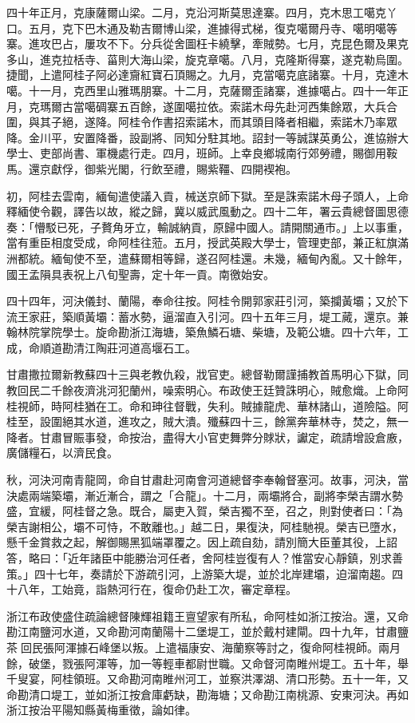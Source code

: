 \begin{pinyinscope}
四十年正月，克康薩爾山梁。二月，克沿河斯莫思達寨。四月，克木思工噶克丫口。五月，克下巴木通及勒吉爾博山梁，進據得式梯，復克噶爾丹寺、噶明噶等寨。進攻巴占，屢攻不下。分兵從舍圖枉卡繞擊，牽賊勢。七月，克昆色爾及果克多山，進克拉栝寺、菑則大海山梁，旋克章噶。八月，克隆斯得寨，遂克勒烏圍。捷聞，上遣阿桂子阿必達齎紅寶石頂賜之。九月，克當噶克底諸寨。十月，克達木噶。十一月，克西里山雅瑪朋寨。十二月，克薩爾歪諸寨，進據噶占。四十一年正月，克瑪爾古當噶碉寨五百餘，遂圍噶拉依。索諾木母先赴河西集餘眾，大兵合圍，與其子絕，遂降。阿桂令作書招索諾木，而其頭目降者相繼，索諾木乃率眾降。金川平，安置降番，設副將、同知分駐其地。詔封一等誠謀英勇公，進協辦大學士、吏部尚書、軍機處行走。四月，班師。上幸良鄉城南行郊勞禮，賜御用鞍馬。還京獻俘，御紫光閣，行飲至禮，賜紫韁、四開褉袍。

初，阿桂去雲南，緬甸遣使議入貢，械送京師下獄。至是誅索諾木母子頭人，上命釋緬使令觀，譯告以故，縱之歸，冀以威武風動之。四十二年，署云貴總督圖思德奏：「懵駁已死，子贅角牙立，輸誠納貢，原歸中國人。請開關通市。」上以事重，當有重臣相度受成，命阿桂往蒞。五月，授武英殿大學士，管理吏部，兼正紅旗滿洲都統。緬甸使不至，遣蘇爾相等歸，遂召阿桂還。未幾，緬甸內亂。又十餘年，國王孟隕具表祝上八旬聖壽，定十年一貢。南徼始安。

四十四年，河決儀封、蘭陽，奉命往按。阿桂令開郭家莊引河，築攔黃壩；又於下流王家莊，築順黃壩：蓄水勢，逼溜直入引河。四十五年三月，堤工蕆，還京。兼翰林院掌院學士。旋命勘浙江海塘，築魚鱗石塘、柴塘，及範公塘。四十六年，工成，命順道勘清江陶莊河道高堰石工。

甘肅撒拉爾新教蘇四十三與老教仇殺，戕官吏。總督勒爾謹捕教首馬明心下獄，同教回民二千餘夜濟洮河犯蘭州，噪索明心。布政使王廷贊誅明心，賊愈熾。上命阿桂視師，時阿桂猶在工。命和珅往督戰，失利。賊據龍虎、華林諸山，道險隘。阿桂至，設圍絕其水道，進攻之，賊大潰。殲蘇四十三，餘黨奔華林寺，焚之，無一降者。甘肅冒賑事發，命按治，盡得大小官吏舞弊分賕狀，讞定，疏請增設倉廒，廣儲糧石，以濟民食。

秋，河決河南青龍岡，命自甘肅赴河南會河道總督李奉翰督塞河。故事，河決，當決處兩端築壩，漸近漸合，謂之「合龍」。十二月，兩壩將合，副將李榮吉謂水勢盛，宜緩，阿桂督之急。既合，屬吏入賀，榮吉獨不至，召之，則對使者曰：「為榮吉謝相公，壩不可恃，不敢離也。」越二日，果復決，阿桂馳視。榮吉已墮水，懸千金賞救之起，解御賜黑狐端罩覆之。因上疏自劾，請別簡大臣董其役，上詔答，略曰：「近年諸臣中能勝治河任者，舍阿桂豈復有人？惟當安心靜鎮，別求善策。」四十七年，奏請於下游疏引河，上游築大堤，並於北岸建壩，迫溜南趨。四十八年，工始竟，詣熱河行在，復命仍赴工次，審定章程。

浙江布政使盛住疏論總督陳輝祖籍王亶望家有所私，命阿桂如浙江按治。還，又命勘江南鹽河水道，又命勘河南蘭陽十二堡堤工，並於戴村建閘。四十九年，甘肅鹽茶回民張阿渾據石峰堡以叛。上遣福康安、海蘭察等討之，復命阿桂視師。兩月餘，破堡，戮張阿渾等，加一等輕車都尉世職。又命督河南睢州堤工。五十年，舉千叟宴，阿桂領班。又命勘河南睢州河工，並察洪澤湖、清口形勢。五十一年，又命勘清口堤工，並如浙江按倉庫虧缺，勘海塘；又命勘江南桃源、安東河決。再如浙江按治平陽知縣黃梅重徵，論如律。


\end{pinyinscope}
